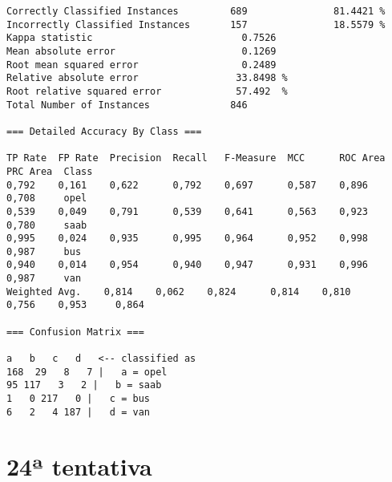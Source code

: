 \documentclass[
	article,			%
	11pt,				%
	oneside,			%
	a4paper,			%
	english,			%
	brazil,				%
	sumario=tradicional
	]{abntex2}
\begin{document}
\begin{lstlisting}
Correctly Classified Instances         689               81.4421 %
Incorrectly Classified Instances       157               18.5579 %
Kappa statistic                          0.7526
Mean absolute error                      0.1269
Root mean squared error                  0.2489
Relative absolute error                 33.8498 %
Root relative squared error             57.492  %
Total Number of Instances              846     

=== Detailed Accuracy By Class ===

TP Rate  FP Rate  Precision  Recall   F-Measure  MCC      ROC Area  PRC Area  Class
0,792    0,161    0,622      0,792    0,697      0,587    0,896     0,708     opel
0,539    0,049    0,791      0,539    0,641      0,563    0,923     0,780     saab
0,995    0,024    0,935      0,995    0,964      0,952    0,998     0,987     bus
0,940    0,014    0,954      0,940    0,947      0,931    0,996     0,987     van
Weighted Avg.    0,814    0,062    0,824      0,814    0,810      0,756    0,953     0,864     

=== Confusion Matrix ===

a   b   c   d   <-- classified as
168  29   8   7 |   a = opel
95 117   3   2 |   b = saab
1   0 217   0 |   c = bus
6   2   4 187 |   d = van

\end{lstlisting}

\section{24ª tentativa}
\end{document}
